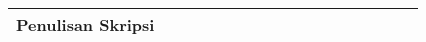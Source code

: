 \begin{table}[h!]
\begin{tabular}{|l|llll|llll|llll|llll|}
		Penulisan Skripsi                                & \multicolumn{1}{l|}{}                         & \multicolumn{1}{l|}{}                         & \multicolumn{1}{l|}{}                         &                                               & \multicolumn{1}{l|}{}                         & \multicolumn{1}{l|}{}                         & \multicolumn{1}{l|}{}                         & \cellcolor[HTML]{9B9B9B} & \multicolumn{1}{l|}{\cellcolor[HTML]{9B9B9B}} & \multicolumn{1}{l|}{\cellcolor[HTML]{9B9B9B}} & \multicolumn{1}{l|}{\cellcolor[HTML]{9B9B9B}} & \cellcolor[HTML]{9B9B9B} & \multicolumn{1}{l|}{\cellcolor[HTML]{9B9B9B}} & \multicolumn{1}{l|}{\cellcolor[HTML]{9B9B9B}} & \multicolumn{1}{l|}{\cellcolor[HTML]{9B9B9B}} & \cellcolor[HTML]{9B9B9B} \\ \hline
	\end{tabular}
\end{table}